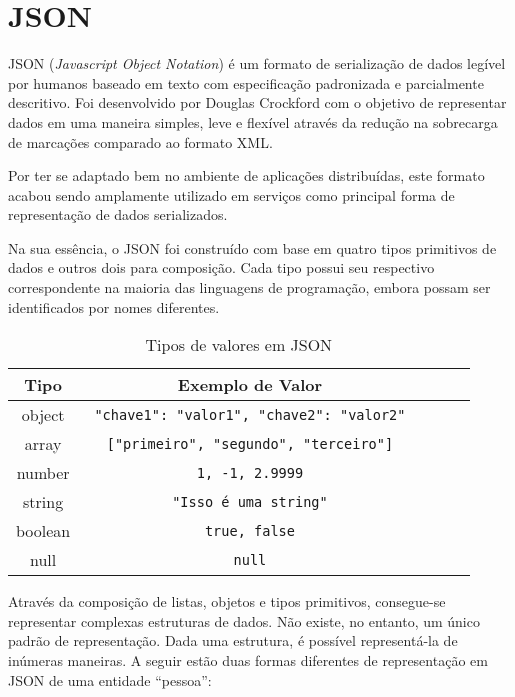 \section{JSON}

JSON (\textit{Javascript Object Notation}) é um formato de serialização de dados legível por humanos baseado em texto com especificação padronizada e parcialmente descritivo. Foi desenvolvido por Douglas Crockford com o objetivo de representar dados em uma maneira simples, leve e flexível através da redução na sobrecarga de marcações comparado ao formato XML.

Por ter se adaptado bem no ambiente de aplicações distribuídas, este formato acabou sendo amplamente utilizado em serviços como principal forma de representação de dados serializados. \cite{Duvander2013}

Na sua essência, o JSON foi construído com base em quatro tipos primitivos de dados e outros dois para composição. Cada tipo possui seu respectivo correspondente na maioria das linguagens de programação, embora possam ser identificados por nomes diferentes. \cite{Droettboom2015}

\begin{table}[H]
  \centering
  \begin{tabular}{|c|c|c|c|c|}
    \hline
    Tipo & Exemplo de Valor \\
    \hline
    object & \texttt{ {"chave1": "valor1", "chave2": "valor2"} } \\
    \hline
    array & \texttt{ ["primeiro", "segundo", "terceiro"] } \\
    \hline
    number & \texttt{ 1, -1, 2.9999 } \\
    \hline
    string & \texttt{ "Isso é uma string" } \\
    \hline
    boolean & \texttt{ true, false } \\
    \hline
    null & \texttt{ null } \\
    \hline
  \end{tabular}
  \caption{Tipos de valores em JSON}
\end{table}

Através da composição de listas, objetos e tipos primitivos, consegue-se representar complexas estruturas de dados. Não existe, no entanto, um único padrão de representação. Dada uma estrutura, é possível representá-la de inúmeras maneiras. A seguir estão duas formas diferentes de representação em JSON de uma entidade “pessoa”:
 \cite{Droettboom2015}


